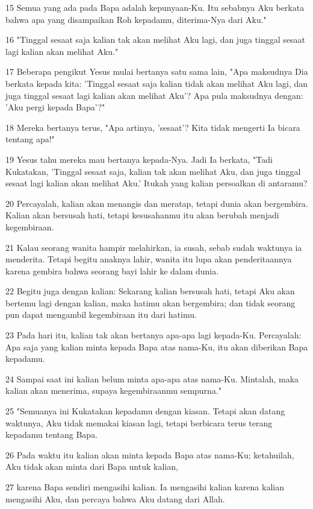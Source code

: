 \par 15 Semua yang ada pada Bapa adalah kepunyaan-Ku. Itu sebabnya Aku berkata bahwa apa yang disampaikan Roh kepadamu, diterima-Nya dari Aku."
\par 16 "Tinggal sesaat saja kalian tak akan melihat Aku lagi, dan juga tinggal sesaat lagi kalian akan melihat Aku."
\par 17 Beberapa pengikut Yesus mulai bertanya satu sama lain, "Apa maksudnya Dia berkata kepada kita: 'Tinggal sesaat saja kalian tidak akan melihat Aku lagi, dan juga tinggal sesaat lagi kalian akan melihat Aku'? Apa pula maksudnya dengan: 'Aku pergi kepada Bapa'?"
\par 18 Mereka bertanya terus, "Apa artinya, 'sesaat'? Kita tidak mengerti Ia bicara tentang apa!"
\par 19 Yesus tahu mereka mau bertanya kepada-Nya. Jadi Ia berkata, "Tadi Kukatakan, 'Tinggal sesaat saja, kalian tak akan melihat Aku, dan juga tinggal sesaat lagi kalian akan melihat Aku.' Itukah yang kalian persoalkan di antaramu?
\par 20 Percayalah, kalian akan menangis dan meratap, tetapi dunia akan bergembira. Kalian akan bersusah hati, tetapi kesusahanmu itu akan berubah menjadi kegembiraan.
\par 21 Kalau seorang wanita hampir melahirkan, ia susah, sebab sudah waktunya ia menderita. Tetapi begitu anaknya lahir, wanita itu lupa akan penderitaannya karena gembira bahwa seorang bayi lahir ke dalam dunia.
\par 22 Begitu juga dengan kalian: Sekarang kalian bersusah hati, tetapi Aku akan bertemu lagi dengan kalian, maka hatimu akan bergembira; dan tidak seorang pun dapat mengambil kegembiraan itu dari hatimu.
\par 23 Pada hari itu, kalian tak akan bertanya apa-apa lagi kepada-Ku. Percayalah: Apa saja yang kalian minta kepada Bapa atas nama-Ku, itu akan diberikan Bapa kepadamu.
\par 24 Sampai saat ini kalian belum minta apa-apa atas nama-Ku. Mintalah, maka kalian akan menerima, supaya kegembiraanmu sempurna."
\par 25 "Semuanya ini Kukatakan kepadamu dengan kiasan. Tetapi akan datang waktunya, Aku tidak memakai kiasan lagi, tetapi berbicara terus terang kepadamu tentang Bapa.
\par 26 Pada waktu itu kalian akan minta kepada Bapa atas nama-Ku; ketahuilah, Aku tidak akan minta dari Bapa untuk kalian,
\par 27 karena Bapa sendiri mengasihi kalian. Ia mengasihi kalian karena kalian mengasihi Aku, dan percaya bahwa Aku datang dari Allah.
